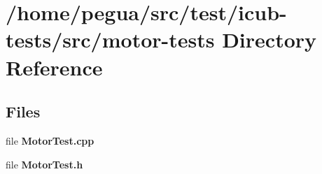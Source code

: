 \section{/home/pegua/src/test/icub-\/tests/src/motor-\/tests Directory Reference}
\label{dir_5eba7e4699fbf6bf477756242c12a311}
\subsection*{Files}
\begin{DoxyCompactItemize}
\item 
file {\bfseries Motor\-Test.\-cpp}
\item 
file {\bfseries Motor\-Test.\-h}
\end{DoxyCompactItemize}
